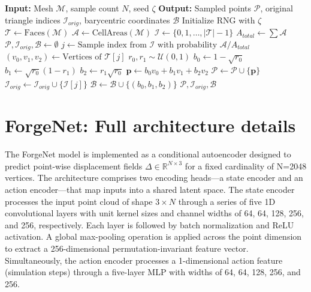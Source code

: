 \documentclass[pdflatex,sn-mathphys-num]{sn-jnl}%
\theoremstyle{thmstyleone}%
\theoremstyle{thmstyletwo}%
\theoremstyle{thmstylethree}%
\begin{document}
\begin{appendices}
\begin{algorithm}
\caption{Area-Weighted Barycentric Mesh Sampling}
\label{alg:barycentric_sampling}
\begin{algorithmic}[1]
\Statex \textbf{Input:} Mesh $\mathcal{M}$, sample count $N$, seed $\zeta$
\Statex \textbf{Output:} Sampled points $\mathcal{P}$, original triangle indices $\mathcal{I}_{orig}$, barycentric coordinates $\mathcal{B}$
\State Initialize RNG with $\zeta$
\State $\mathcal{T} \gets \text{Faces}(\mathcal{M})$
\State $\mathcal{A} \gets \text{CellAreas}(\mathcal{M})$
\State $\mathcal{I} \gets \{0, 1, \dots, |\mathcal{T}|-1\}$ 
\State $A_{total} \gets \sum \mathcal{A}$
\State $\mathcal{P}, \mathcal{I}_{orig}, \mathcal{B} \leftarrow \emptyset$
\State
{}
    \State $j \gets \text{Sample index from } \mathcal{I} \text{ with probability } \mathcal{A}/A_{total}$
    \State $(v_0, v_1, v_2) \gets \text{Vertices of } \mathcal{T}[j]$
    \State $r_0, r_1 \sim \mathcal{U}(0, 1)$ 
    \State
    \State $b_0 \leftarrow 1 - \sqrt{r_0}$ 
    \State $b_1 \leftarrow \sqrt{r_0}(1 - r_1)$
    \State $b_2 \leftarrow r_1\sqrt{r_0}$
    \State
    \State $\mathbf{p} \leftarrow b_0 v_0 + b_1 v_1 + b_2 v_2$
    \State
    \State $\mathcal{P} \leftarrow \mathcal{P} \cup \{\mathbf{p}\}$
    \State $\mathcal{I}_{orig} \leftarrow \mathcal{I}_{orig} \cup \{\mathcal{I}[j]\}$
    \State $\mathcal{B} \leftarrow \mathcal{B} \cup \{(b_0, b_1, b_2)\}$
\EndFor
\State \Return $\mathcal{P}, \mathcal{I}_{orig}, \mathcal{B}$
\end{algorithmic}
\end{algorithm}

\section{ForgeNet: Full architecture details}\label{sec:architecture}

The ForgeNet model is implemented as a conditional autoencoder designed to predict point-wise displacement fields \(\Delta \in \mathbb{R}^{N \times 3}\) for a fixed cardinality of N=2048 vertices. The architecture comprises two encoding heads—a state encoder and an action encoder—that map inputs into a shared latent space. The state encoder processes the input point cloud of shape \(3 \times N\) through a series of five 1D convolutional layers with unit kernel sizes and channel widths of 64, 64, 128, 256, and 256, respectively. Each layer is followed by batch normalization and ReLU activation. A global max-pooling operation is applied across the point dimension to extract a 256-dimensional permutation-invariant feature vector. Simultaneously, the action encoder processes a 1-dimensional action feature (simulation steps) through a five-layer MLP with widths of 64, 64, 128, 256, and 256.


\end{appendices}
\end{document}
